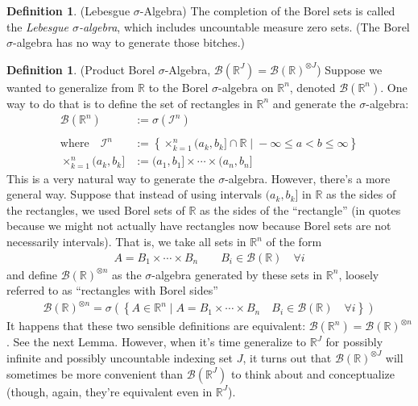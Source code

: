 \documentclass[12pt]{article}
\theoremstyle{plain}
\theoremstyle{definition}
\newtheorem{defn}[thm]{Definition}
\theoremstyle{remark}
\newcommand{\sB}{\mathscr{B}}
\newcommand{\sI}{\mathscr{I}}
\newcommand{\R}{\mathbb{R}}
\newcommand{\Rn}{\mathbb{R}^n}
\begin{document}
\begin{defn}(Lebesgue $\sigma$-Algebra)
The completion of the Borel sets is called the
\emph{Lebesgue $\sigma$-algebra}, which includes uncountable measure
zero sets. (The Borel $\sigma$-algebra has no way to generate those
bitches.)
\end{defn}

\begin{defn}(Product Borel $\sigma$-Algebra,
$\sB(\R^J)=\sB(\R)^{\otimes J}$)
Suppose we wanted to generalize from $\R$ to the Borel $\sigma$-algebra
on $\Rn$, denoted $\sB(\R^n)$. One way to do that is to define the set
of rectangles in $\Rn$ and generate the $\sigma$-algebra:
\begin{align*}
  \sB(\Rn) &:= \sigma(\sI^n) \\\\
  \text{where} \quad
  \sI^n &:=
  \left\{
    \times_{k=1}^n (a_{k},b_{k}] \cap \R
    \;|\; -\infty\leq a < b \leq \infty
  \right\} \\
  \times_{k=1}^n (a_{k},b_{k}]
  &:=
  (a_{1},b_{1}]
  \times \cdots\times
  (a_{n},b_{n}]
\end{align*}
This is a very natural way to generate the $\sigma$-algebra. However,
there's a more general way. Suppose that instead of using intervals
$(a_k,b_k]$ in $\R$ as the sides of the rectangles, we used Borel sets
of $\R$ as the sides of the ``rectangle'' (in quotes because we might
not actually have rectangles now because Borel sets are not necessarily
intervals).
That is, we take all sets in $\Rn$ of the form
\begin{align*}
  A = B_1 \times \cdots \times B_n
  \qquad B_i \in \sB(\R) \quad\forall i
\end{align*}
and define $\sB(\R)^{\otimes n}$ as the $\sigma$-algebra generated by
these sets in $\Rn$, loosely referred to as ``rectangles with Borel
sides''
\begin{align*}
  \sB(\R)^{\otimes n}
  =
  \sigma
  \left(
  \left\{
  A \in \Rn \;|\;
  A = B_1 \times \cdots \times B_n
  \quad B_i \in \sB(\R) \quad\forall i
  \right\}
  \right)
\end{align*}
It happens that these two sensible definitions are equivalent:
$\sB(\Rn)=\sB(\R)^{\otimes n}$. See the next Lemma. However, when it's
time generalize to $\R^J$ for possibly infinite and possibly uncountable
indexing set $J$, it turns out that $\sB(\R)^{\otimes J}$ will
sometimes be more convenient than $\sB(\R^J)$ to think about and
conceptualize (though, again, they're equivalent even in $\R^J$).


\end{defn}
\end{document}

